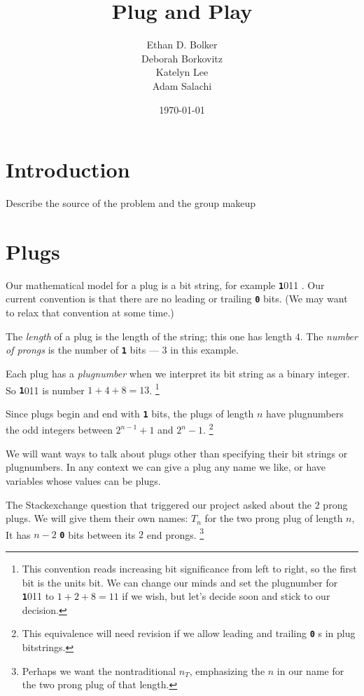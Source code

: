 \documentclass[10pt]{article}
\title{Plug and Play}
\author{
Ethan D. Bolker \\
Deborah Borkovitz\\
  Katelyn Lee\\
  Adam Salachi
}
\date{\today}
\numberwithin{equation}{section}
\newenvironment{anote}
               {{\textcolor{blue}{Note:}}
                 \itshape
               }
               {}
\newcommand{\plug}[1]{%
\mbox{{\textbf\texttt #1}}
}
\begin{document}
\maketitle

\section{Introduction}

\begin{anote}
Describe the source of the problem and the group makeup
\end{anote}



\section{Plugs}

Our mathematical model for a plug is a bit string, for example
\plug{1011}. Our current convention is that there are no leading or
trailing \plug{0} bits. (We may want to relax that convention at some
time.)

The \emph{length} of a plug is the length of the string; this one has
length $4$. The \emph{number of prongs} is the number of \plug{1} bits
--- $3$ in this example.


Each plug has a \emph{plugnumber} when we
interpret its bit string as a binary integer. So \plug{1011} is
number $1 + 4 + 8 = 13$.%
\footnote{This convention reads increasing bit significance from left
  to right, so the first bit is the units bit. We can change our minds
  and set the plugnumber for \plug{1011} to $1+2+8 = 11$ if we wish,
  but let's decide soon and stick to our decision.}

Since plugs begin and end with \plug{1} bits,
the plugs of length $n$ have plugnumbers the odd integers between
$2^{n-1} +1$ and $2^n -1$.
\footnote{This equivalence will need revision if we allow leading and
  trailing \plug{0}s in plug bitstrings.}

We will want ways to talk about plugs other than specifying their bit
strings or plugnumbers. In any context we can give a plug any name we
like, or have variables whose values can be plugs.

The Stackexchange question that triggered our project asked about
the $2$ prong plugs. We will give
them their own names: $T_n$ for the two prong plug of length $n$, It
has $n-2$ \plug{0} bits between its $2$ end prongs.
\footnote{Perhaps we want the nontraditional $n_T$, emphasizing the
  $n$ in our name for the two prong plug of that length.}
\end{document}
